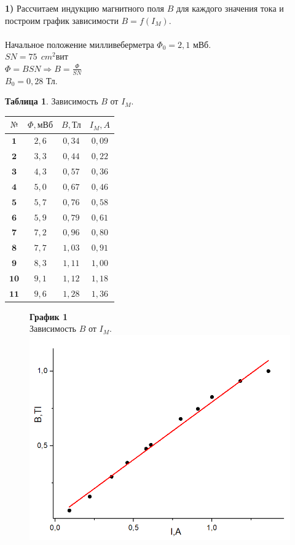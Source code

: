 \documentclass[11pt,a4paper]{article}
\begin{document}
	\textbf{1)} Рассчитаем индукцию магнитного поля $B$ для каждого значения тока и построим график зависимости $B=f(I_M)$.
	\\\\
	Начальное положение милливеберметра $\Phi_0 = 2,1$ мВб.
	\\
	$SN = 75 \ \ cm^2 \text{вит}$ \\
	$\Phi = BSN \Rightarrow B = \frac{\Phi}{SN}$ \\
	$B_0 = 0,28$ Тл.
	\begin{table}[h!]
		\begin{center}
			\textbf{Таблица 1}. Зависимость $B$ от $I_M$.\\
			\begin{tabular}{|c|c|c|c|}
				\hline
				$\text{№}$  & $\Phi,\text{мВб}$ & $B,\text{Тл}$ & $I_M,A$ \\ \hline
				$\textbf{1}$ & $2,6$ & $0,34$  & $0,09$ \\ \hline
				$\textbf{2}$ & $3,3$ & $0,44$  & $0,22$ \\ \hline
				$\textbf{3}$ & $4,3$ & $0,57$  & $0,36$ \\ \hline
				$\textbf{4}$ & $5,0$ & $0,67$  & $0,46$ \\ \hline
				$\textbf{5}$ & $5,7$ & $0,76$  & $0,58$ \\ \hline
				$\textbf{6}$ & $5,9$ & $0,79$  & $0,61$ \\ \hline
				$\textbf{7}$ & $7,2$ & $0,96$  & $0,80$ \\ \hline
				$\textbf{8}$ & $7,7$ & $1,03$  & $0,91$ \\ \hline
				$\textbf{9}$ & $8,3$ & $1,11$  & $1,00$ \\ \hline
				$\textbf{10}$ & $9,1$ & $1,12$  & $1,18$ \\ \hline
				$\textbf{11}$ & $9,6$ & $1,28$  & $1,36$ \\ \hline
		\end{tabular}
\end{center}
\end{table}
\newpage
\begin{figure} [h!]
	\centering
	\textbf {График 1} \\
	Зависимость $B$ от $I_M$.\\
	\includegraphics[width=0.6\linewidth]{1}
\end{figure}
\end{document}
